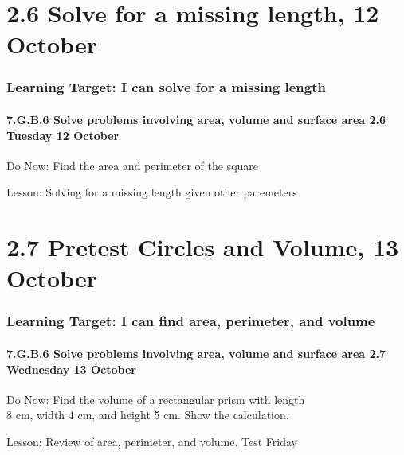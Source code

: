\documentclass{beamer}
\begin{document}
\section{2.6 Solve for a missing length, 12 October}
\frame
{
  \frametitle{Learning Target: I can solve for a missing length}
  \framesubtitle{7.G.B.6 Solve problems involving area, volume and surface area \hfill \alert{2.6 Tuesday 12 October}}
  \begin{block}{Do Now: Find the area and perimeter of the square}
    \begin{flushleft}
    \end{flushleft}
\end{block}
  Lesson: Solving for a missing length given other paremeters
} 

\section{2.7 Pretest Circles and Volume, 13 October}
\frame
{
  \frametitle{Learning Target: I can find area, perimeter, and volume}
  \framesubtitle{7.G.B.6 Solve problems involving area, volume and surface area \hfill \alert{2.7 Wednesday 13 October}}
  \begin{block}{Do Now: Find the volume of a rectangular prism with length \\8 cm, width 4 cm, and height 5 cm. Show the calculation.}
    \begin{flushright}
      \end{flushright}
\end{block}
  Lesson: Review of area, perimeter, and volume. \alert{Test Friday}
} 
\end{document}
